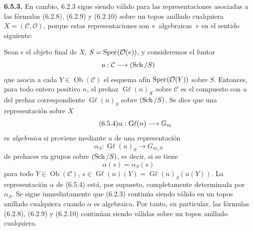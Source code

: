 \textbf{6.5.3.} En cambio, 6.2.3 sigue siendo válido para las
representaciones asociadas a las fórmulas (6.2.8), (6.2.9) y (6.2.10) sobre
un topos anillado cualquiera \(X=(\mathcal C,\mathcal O)\), porque estas
representaciones son «~algebraicas~» en el sentido siguiente:

Sean \(e\) el objeto final de \(X\), \(S=\operatorname{Spec}(\mathcal O(e))\), y
consideremos el funtor
\[
 u:\mathcal C\longrightarrow(\operatorname{Sch}/S)
\]
que asocia a cada \(Y\in\operatorname{Ob}(\mathcal C)\) el esquema afín
\(\operatorname{Spec}(\mathcal O(Y))\) sobre \(S\). Entonces, para todo entero positivo
\(n\), el prehaz \(\operatorname{G\ell}(n)_X\) sobre \(\mathcal C\) es el
compuesto con \(u\) del prehaz correspondiente
\(\operatorname{G\ell}(n)_S\) sobre \((\operatorname{Sch}/S)\). Se dice que una
representación sobre \(X\)
\begin{equation}\tag{6.5.4}
 \alpha:\operatorname{G\ell}(n)\longrightarrow\mathbb G_m
\end{equation}
es \emph{algebraica} si proviene mediante \(u\) de una representación
\begin{equation}\tag{6.5.5}
 \alpha_S:\operatorname{G\ell}(n)_S\longrightarrow G_{m,S}
\end{equation}
de prehaces en grupos sobre \((\operatorname{Sch}/S)\), es decir, si se tiene
\[
 \alpha(s)=\alpha_S(s)
\]
para todo \(Y\in\operatorname{Ob}(\mathcal C)\),
\(s\in\operatorname{G\ell}(n)(Y)=\operatorname{G\ell}(n)_S(u(Y))\). La
representación \(\alpha\) de (6.5.4) está, por supuesto, completamente
determinada por \(\alpha_S\). Se sigue inmediatamente que (6.2.3) continúa
siendo válido en un topos anillado cualquiera cuando \(\alpha\) es
algebraica. Por tanto, en particular, las fórmulas (6.2.8), (6.2.9) y
(6.2.10) continúan siendo válidas sobre un topos anillado cualquiera.
